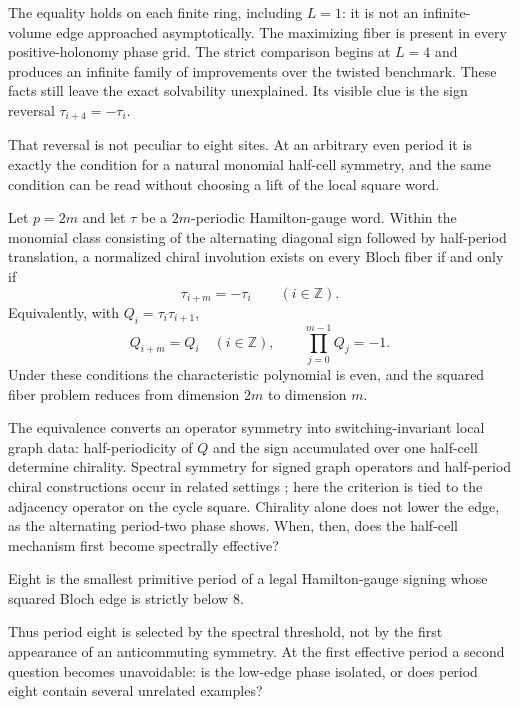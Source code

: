 The equality holds on each finite ring, including $L=1$: it is not an
infinite-volume edge approached asymptotically.  The maximizing fiber is
present in every positive-holonomy phase grid.  The strict comparison begins
at $L=4$ and produces an infinite family of improvements over the twisted
benchmark.  These facts still leave the exact solvability unexplained.  Its
visible clue is the sign reversal $\tau_{i+4}=-\tau_i$.

That reversal is not peculiar to eight sites.  At an arbitrary even period it
is exactly the condition for a natural monomial half-cell symmetry, and the
same condition can be read without choosing a lift of the local square word.

\begin{theorem}
\label{thm:main-chiral}
Let $p=2m$ and let $\tau$ be a $2m$-periodic Hamilton-gauge word.  Within the
monomial class consisting of the alternating diagonal sign followed by
half-period translation, a normalized chiral involution exists on every Bloch
fiber if and only if
\[
 \tau_{i+m}=-\tau_i\qquad(i\in\mathbb Z).
\]
Equivalently, with $Q_i=\tau_i\tau_{i+1}$,
\[
 Q_{i+m}=Q_i\quad(i\in\mathbb Z),\qquad
 \prod_{j=0}^{m-1}Q_j=-1.
\]
Under these conditions the characteristic polynomial is even, and the squared
fiber problem reduces from dimension $2m$ to dimension $m$.
\end{theorem}

The equivalence converts an operator symmetry into switching-invariant local
graph data: half-periodicity of $Q$ and the sign accumulated over one
half-cell determine chirality.  Spectral symmetry for signed graph operators
and half-period chiral constructions occur in related settings
\cite{AtayHua2016,CedzichEtAl2021}; here the criterion is tied to the adjacency
operator on the cycle square.  Chirality alone does not lower the edge, as the
alternating period-two phase shows.  When, then, does the half-cell mechanism
first become spectrally effective?

\begin{theorem}
\label{thm:main-minimal}
Eight is the smallest primitive period of a legal Hamilton-gauge signing whose
squared Bloch edge is strictly below $8$.
\end{theorem}

Thus period eight is selected by the spectral threshold, not by the first
appearance of an anticommuting symmetry.  At the first effective period a
second question becomes unavoidable: is the low-edge phase isolated, or does
period eight contain several unrelated examples?

